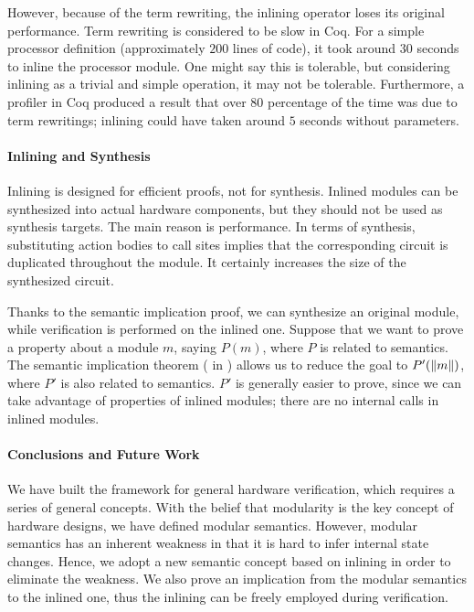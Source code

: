 However, because of the term rewriting, the inlining operator loses
its original performance. Term rewriting is considered to be slow in
Coq. For a simple processor definition (approximately $200$ lines of
code), it took around $30$ seconds to inline the processor module. One
might say this is tolerable, but considering inlining as a trivial and
simple operation, it may not be tolerable. Furthermore, a profiler in
Coq produced a result that over $80$ percentage of the time was due to
term rewritings; inlining could have taken around $5$ seconds without
parameters.

\paragraph{Inlining and Synthesis}

Inlining is designed for efficient proofs, not for synthesis. Inlined
modules can be synthesized into actual hardware components, but they
should not be used as synthesis targets. The main reason is
performance. In terms of synthesis, substituting action bodies to call
sites implies that the corresponding circuit is duplicated throughout
the module. It certainly increases the size of the synthesized
circuit.

Thanks to the semantic implication proof, we can synthesize an
original module, while verification is performed on the inlined
one. Suppose that we want to prove a property about a module $m$,
saying $P(m)$, where $P$ is related to semantics. The semantic
implication theorem ( in
) allows us to reduce the goal to
$P'(\| m \|)$, where $P'$ is also related to semantics. $P'$ is
generally easier to prove, since we can take advantage of properties
of inlined modules; \eg{} there are no internal calls in inlined
modules.

\paragraph{Conclusions and Future Work}

We have built the \Kami{} framework for general hardware verification,
which requires a series of general concepts. With the belief that
modularity is the key concept of hardware designs, we have defined
modular semantics. However, modular semantics has an inherent weakness
in that it is hard to infer internal state changes. Hence, we adopt a
new semantic concept based on inlining in order to eliminate the
weakness. We also prove an implication from the modular semantics to
the inlined one, thus the inlining can be freely employed during
verification.

